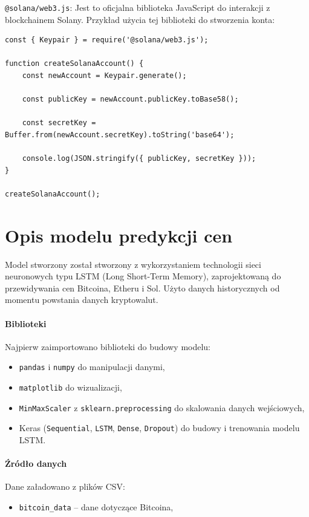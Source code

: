  \texttt{@solana/web3.js}: Jest to oficjalna biblioteka JavaScript do interakcji z blockchainem Solany.  
  Przykład użycia tej biblioteki do stworzenia konta:
  \begin{lstlisting}
const { Keypair } = require('@solana/web3.js');

function createSolanaAccount() {
    const newAccount = Keypair.generate();

    const publicKey = newAccount.publicKey.toBase58();

    const secretKey = Buffer.from(newAccount.secretKey).toString('base64');

    console.log(JSON.stringify({ publicKey, secretKey }));
}

createSolanaAccount();
  \end{lstlisting}
	
\section{Opis modelu predykcji cen}
Model stworzony został stworzony z wykorzystaniem technologii sieci neuronowych typu LSTM (Long Short-Term Memory), zaprojektowaną do przewidywania cen Bitcoina, Etheru i Sol. Użyto danych historycznych od momentu powstania danych kryptowalut.

\paragraph{Biblioteki}
Najpierw zaimportowano biblioteki do budowy modelu:

\begin{itemize}
    \item \texttt{pandas} i \texttt{numpy} do manipulacji danymi,
    \item \texttt{matplotlib} do wizualizacji,
    \item \texttt{MinMaxScaler} z \texttt{sklearn.preprocessing} do skalowania danych wejściowych,
    \item Keras (\texttt{Sequential}, \texttt{LSTM}, \texttt{Dense}, \texttt{Dropout}) do budowy i trenowania modelu LSTM.
\end{itemize}

\paragraph{Źródło danych}
Dane załadowano z plików CSV:

\begin{itemize}
    \item \texttt{bitcoin\_data} – dane dotyczące Bitcoina,
\end{itemize}

